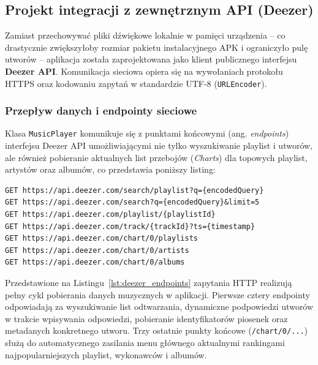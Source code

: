 \subsection{Projekt integracji z zewnętrznym API (Deezer)}

\hspace{0.60cm}Zamiast przechowywać pliki dźwiękowe lokalnie w pamięci urządzenia – co drastycznie zwiększyłoby rozmiar pakietu instalacyjnego APK i ograniczyło pulę utworów – aplikacja została zaprojektowana jako klient publicznego interfejsu \textbf{Deezer API}. Komunikacja sieciowa opiera się na wywołaniach protokołu HTTPS oraz kodowaniu zapytań w standardzie UTF-8 (\texttt{URLEncoder}).

\subsubsection{Przepływ danych i endpointy sieciowe}

\hspace{0.60cm}Klasa \texttt{MusicPlayer} komunikuje się z punktami końcowymi (ang. \textit{endpoints}) interfejsu Deezer API umożliwiającymi nie tylko wyszukiwanie playlist i utworów, ale również pobieranie aktualnych list przebojów (\textit{Charts}) dla topowych playlist, artystów oraz albumów, co przedstawia poniższy listing:

\begin{lstlisting}[caption={Wykorzystywane endpointy publicznego interfejsu Deezer API}, label={lst:deezer_endpoints}]
GET https://api.deezer.com/search/playlist?q={encodedQuery}
GET https://api.deezer.com/search?q={encodedQuery}&limit=5
GET https://api.deezer.com/playlist/{playlistId}
GET https://api.deezer.com/track/{trackId}?ts={timestamp}
GET https://api.deezer.com/chart/0/playlists
GET https://api.deezer.com/chart/0/artists
GET https://api.deezer.com/chart/0/albums
\end{lstlisting}

\hspace{0.60cm}Przedstawione na Listingu~\ref{lst:deezer_endpoints} zapytania HTTP realizują pełny cykl pobierania danych muzycznych w aplikacji. Pierwsze cztery endpointy odpowiadają za wyszukiwanie list odtwarzania, dynamiczne podpowiedzi utworów w trakcie wpisywania odpowiedzi, pobieranie identyfikatorów piosenek oraz metadanych konkretnego utworu. Trzy ostatnie punkty końcowe (\texttt{/chart/0/...}) służą do automatycznego zasilania menu głównego aktualnymi rankingami najpopularniejszych playlist, wykonawców i albumów.

